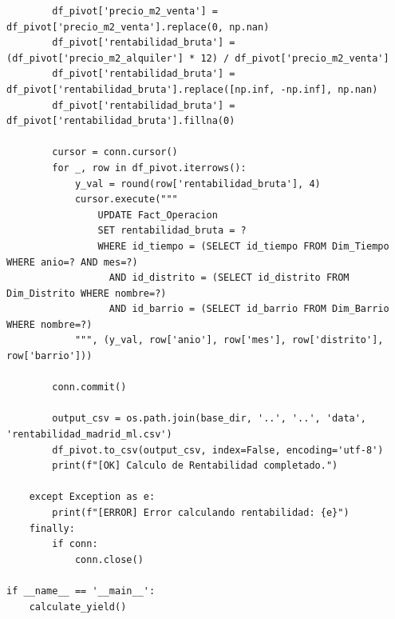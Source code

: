 \documentclass[a4paper,11pt,openany]{book}
\begin{document}
\begin{lstlisting}
        df_pivot['precio_m2_venta'] = df_pivot['precio_m2_venta'].replace(0, np.nan)
        df_pivot['rentabilidad_bruta'] = (df_pivot['precio_m2_alquiler'] * 12) / df_pivot['precio_m2_venta']
        df_pivot['rentabilidad_bruta'] = df_pivot['rentabilidad_bruta'].replace([np.inf, -np.inf], np.nan)
        df_pivot['rentabilidad_bruta'] = df_pivot['rentabilidad_bruta'].fillna(0)

        cursor = conn.cursor()
        for _, row in df_pivot.iterrows():
            y_val = round(row['rentabilidad_bruta'], 4)
            cursor.execute("""
                UPDATE Fact_Operacion 
                SET rentabilidad_bruta = ? 
                WHERE id_tiempo = (SELECT id_tiempo FROM Dim_Tiempo WHERE anio=? AND mes=?)
                  AND id_distrito = (SELECT id_distrito FROM Dim_Distrito WHERE nombre=?)
                  AND id_barrio = (SELECT id_barrio FROM Dim_Barrio WHERE nombre=?)
            """, (y_val, row['anio'], row['mes'], row['distrito'], row['barrio']))

        conn.commit()
        
        output_csv = os.path.join(base_dir, '..', '..', 'data', 'rentabilidad_madrid_ml.csv')
        df_pivot.to_csv(output_csv, index=False, encoding='utf-8')
        print(f"[OK] Calculo de Rentabilidad completado.")

    except Exception as e:
        print(f"[ERROR] Error calculando rentabilidad: {e}")
    finally:
        if conn:
            conn.close()

if __name__ == '__main__':
    calculate_yield()
\end{lstlisting}
\end{document}
